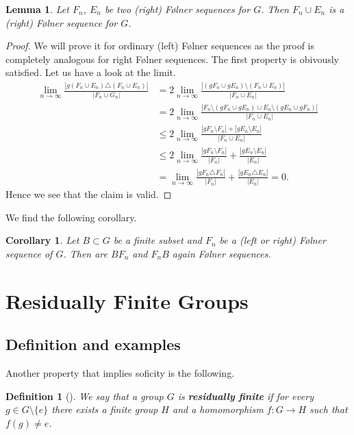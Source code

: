 \documentclass[titlepage, a4paper]{article}
\newcommand{\card}[1]{\left| #1 \right|}
\newtheorem{definition}[theorem]{Definition}
\newtheorem{lemma}[theorem]{Lemma}
\newtheorem{corollary}[theorem]{Corollary}
\theoremstyle{remark}
\begin{document}
\begin{lemma}
	Let $F_n$, $E_n$ be two (right) Følner sequences for $G$. Then $F_n \cup E_n$ is a (right) Følner sequence for $G$.
\end{lemma}
\begin{proof}
	We will prove it for ordinary (left) Følner sequences as the proof is completely analogous for right Følner sequences.
	The first property is obivously satisfied. 
	Let us have a look at the limit.
	\begin{align*}
		\lim_{n \to \infty} \frac{\card{g(F_n \cup E_n) \triangle (F_n \cup E_n)}}{\card{F_n \cup G_n}} &= 2 \lim_{n \to \infty} \frac{\card{(gF_n \cup gE_n)\setminus (F_n \cup E_n)}}{\card{F_n \cup E_n}} \\
														&= 2 \lim_{n \to \infty} \frac{\card{F_n \setminus (gF_n \cup g E_n) \cup E_n\setminus (gE_n \cup gF_n) }}{\card{F_n \cup E_n}} \\
														&\le 2 \lim_{n \to \infty} \frac{\card{gF_n \setminus F_n} + \card{gE_n \setminus E_n}}{\card{F_n \cup E_n}}\\
														&\le 2 \lim_{n \to \infty}  \frac{\card{gF_n \setminus F_n}}{\card{F_n}} + \frac{\card{gE_n \setminus E_n}}{\card{E_n}} \\
														&=  \lim_{n \to \infty} \frac{\card{gF_n \triangle F_n}}{\card{F_n}} +  \frac{\card{gE_n \triangle E_n}}{\card{E_n}}= 0  
	.\end{align*}
	Hence we see that the claim is valid.
\end{proof}
We find the following corollary. 
\begin{corollary}\label{cor:product_folner_sequence}
	Let $B \subset G$ be a finite subset and $F_n$ be a (left or right) Følner sequence of $G$. Then are $BF_n$ and $F_nB$ again Følner sequences.
\end{corollary}


\section{Residually Finite Groups}

\subsection{Definition and examples}

Another property that implies soficity is the following.

\begin{definition}[{\cite[ch. 1 p. 16]{hall_groups}}] \label{def:res_fin}
	We say that a group $G$ is \textbf{residually finite} if for every $g \in G\setminus\{e\}$ there exists a finite group $H$ and a homomorphism $f:G \to H$ such that $f(g) \ne e$.
\end{definition}
\end{document}
